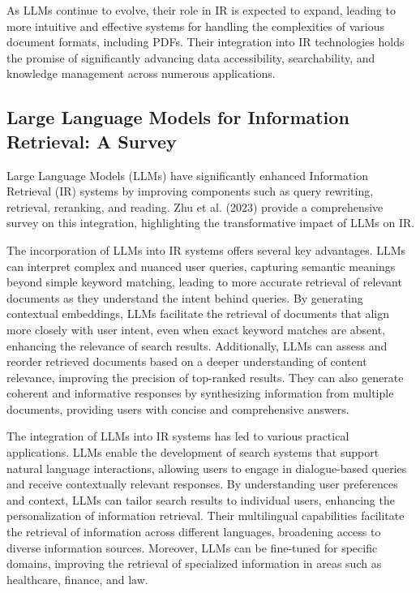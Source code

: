 As LLMs continue to evolve, their role in IR is expected to expand, leading to more intuitive and effective systems for handling the complexities of various document formats, including PDFs. Their integration into IR technologies holds the promise of significantly advancing data accessibility, searchability, and knowledge management across numerous applications.


\subsection{Large Language Models for Information Retrieval: A Survey}

\noindent Large Language Models (LLMs) have significantly enhanced Information Retrieval (IR) systems by improving components such as query rewriting, retrieval, reranking, and reading. Zhu et al. (2023) provide a comprehensive survey on this integration, highlighting the transformative impact of LLMs on IR.

The incorporation of LLMs into IR systems offers several key advantages. LLMs can interpret complex and nuanced user queries, capturing semantic meanings beyond simple keyword matching, leading to more accurate retrieval of relevant documents as they understand the intent behind queries. By generating contextual embeddings, LLMs facilitate the retrieval of documents that align more closely with user intent, even when exact keyword matches are absent, enhancing the relevance of search results. Additionally, LLMs can assess and reorder retrieved documents based on a deeper understanding of content relevance, improving the precision of top-ranked results. They can also generate coherent and informative responses by synthesizing information from multiple documents, providing users with concise and comprehensive answers.

The integration of LLMs into IR systems has led to various practical applications. LLMs enable the development of search systems that support natural language interactions, allowing users to engage in dialogue-based queries and receive contextually relevant responses. By understanding user preferences and context, LLMs can tailor search results to individual users, enhancing the personalization of information retrieval. Their multilingual capabilities facilitate the retrieval of information across different languages, broadening access to diverse information sources. Moreover, LLMs can be fine-tuned for specific domains, improving the retrieval of specialized information in areas such as healthcare, finance, and law.

